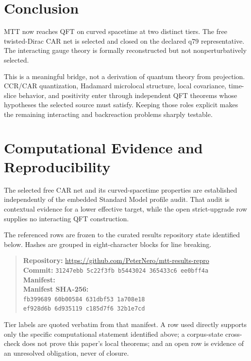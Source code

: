 \documentclass[11pt]{article}
\theoremstyle{definition}
\theoremstyle{remark}
\begin{document}
\section{Conclusion}

MTT now reaches QFT on curved spacetime at two distinct tiers. The free
twisted-Dirac CAR net is selected and closed on the declared q79
representative. The interacting gauge theory is formally reconstructed but
not nonperturbatively selected.

This is a meaningful bridge, not a derivation of quantum theory from
projection. CCR/CAR quantization, Hadamard microlocal structure, local
covariance, time-slice behavior, and positivity enter through independent
QFT theorems whose hypotheses the selected source must satisfy. Keeping
those roles explicit makes the remaining interacting and backreaction
problems sharply testable.

\section*{Computational Evidence and Reproducibility}
The selected free CAR net and its curved-spacetime properties are established independently of the embedded Standard Model profile audit. That audit is contextual evidence for a lower effective target, while the open strict-upgrade row supplies no interacting QFT construction.

The referenced rows are frozen to the curated results repository state identified below. Hashes are grouped in eight-character blocks for line breaking.
\begin{quote}\small
\textbf{Repository:} \url{https://github.com/PeterNero/mtt-results-repro}\\
\textbf{Commit:} \texttt{31247ebb 5c22f3fb b5443024 365433c6 ee0bff4a}\\
\textbf{Manifest:} \\
\textbf{Manifest SHA-256:}\\
\texttt{fb399689 60b00584 631dbf53 1a708e18}\\
\texttt{ef928d6b 6d935119 c185d7f6 32b1e7cd}
\end{quote}

Tier labels are quoted verbatim from that manifest. A row used directly supports only the specific computational statement identified above; a corpus-state cross-check does not prove this paper's local theorems; and an open row is evidence of an unresolved obligation, never of closure.
\end{document}
